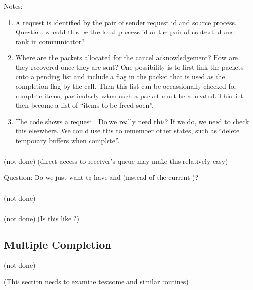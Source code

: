 \subsubsection{\tcpname}
\ifcodefirst
{}
\fi

Notes:
\begin{enumerate}
\item A request is identified by the pair of sender request id and
source process.  Question: should this be the local process id or the
pair of context id and rank in communicator?

\item Where are the packets allocated for the cancel acknowledgement?
How are they recovered once 
they are sent? One possibility is to first link the packets onto a
pending list and include a flag in the packet that is used as the
completion flag by the  call.  Then this list can
be occassionally checked for complete items, particularly when such a
packet must be allocated.  This list then become a list of ``items to
be freed soon''.

\item The code shows a request .  Do we really need this?
If we do, we need to check this elsewhere.  We could use this to
remember other states, such as ``delete temporary buffers when
complete''.

\end{enumerate}

\ifcodefirst
\else
{}
\fi

\subsubsection{\shmemname}
(not done)
(direct access to receiver's queue may make this relatively easy)

Question: Do we just want to have 
and  (instead of the current
)? 

\subsubsection{\shmemallname}
(not done)

\subsubsection{\vianame}
(not done)
(Is this like \tcpname?)

\subsection{Multiple Completion}
(not done)

(This section needs to examine testsome and similar routines)

